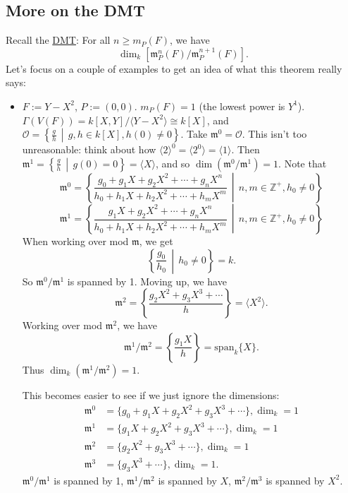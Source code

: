 \documentclass[12pt]{article}
\newcommand{\z}{\mathbb{Z}}
\newcommand{\vbrack}[1]{\langle #1\rangle}
\theoremstyle{definition}
\begin{document}
\subsection{More on the DMT}
Recall the \underline{DMT}: For all $n\geq m_P(F)$, we have
\[\dim_k\left[\mathfrak{m}_P^n(F)/\mathfrak{m}_P^{n+1}(F)\right].\]
Let's focus on a couple of examples to get an idea of what this theorem really says:
\begin{itemize}
    \item $F:=Y-X^2$, $P:=(0,0)$. $m_P(F)=1$ (the lowest power is $Y^1$). $\Gamma(V(F))=k[X,Y]/\vbrack{Y-X^2}\cong k[X]$, and $\mathcal{O}=\left\{\frac{g}{h}\,\middle|\,g,h\in k[X],h(0)\neq0\right\}$. Take $\mathfrak{m}^0=\mathcal{O}$. This isn't too unreasonable: think about how $\vbrack{2}^0=\vbrack{2^0}=\vbrack{1}$. Then $\mathfrak{m}^1=\left\{\frac{g}{h}\,\middle|\,g(0)=0\right\}=\vbrack{X}$, and so $\dim(\mathfrak{m}^0/\mathfrak{m}^1)=1$. Note that
    \[\mathfrak{m}^0=\left\{\frac{g_0+g_1X+g_2X^2+\dotsb+g_nX^n}{h_0+h_1X+h_2X^2+\dotsb+h_mX^m}\,\middle|\,n,m\in\z^+,h_0\neq0\right\}\]
    \[\mathfrak{m}^1=\left\{\frac{g_1X+g_2X^2+\dotsb+g_nX^n}{h_0+h_1X+h_2X^2+\dotsb+h_mX^m}\,\middle|\,n,m\in\z^+,h_0\neq0\right\}\]
    When working over mod $\mathfrak{m}$, we get
    \[\left\{\frac{g_0}{h_0}\,\middle|\,h_0\neq0\right\}=k.\]
    So $\mathfrak{m}^0/\mathfrak{m}^1$ is spanned by 1. Moving up, we have
    \[\mathfrak{m}^2=\left\{\frac{g_2X^2+g_3X^3+\dotsb}{h}\right\}=\vbrack{X^2}.\]
    Working over mod $\mathfrak{m}^2$, we have
    \[\mathfrak{m}^1/\mathfrak{m}^2=\left\{\frac{g_1X}{h}\right\}=\text{span}_k\{X\}.\]
    Thus $\dim_k(\mathfrak{m}^1/\mathfrak{m}^2)=1$.
    
    This becomes easier to see if we just ignore the dimensions:
    \begin{align*}
        \mathfrak{m}^0&=\{g_0+g_1X+g_2X^2+g_3X^3+\dotsb\},\dim_k=1\\
        \mathfrak{m}^1&=\{g_1X+g_2X^2+g_3X^3+\dotsb\},\dim_k=1\\
        \mathfrak{m}^2&=\{g_2X^2+g_3X^3+\dotsb\},\dim_k=1\\
        \mathfrak{m}^3&=\{g_3X^3+\dotsb\},\dim_k=1.
    \end{align*}
    $\mathfrak{m}^0/\mathfrak{m}^1$ is spanned by 1, $\mathfrak{m}^1/\mathfrak{m}^2$ is spanned by $X$, $\mathfrak{m}^2/\mathfrak{m}^3$ is spanned by $X^2$.
    

\end{itemize}
\end{document}
